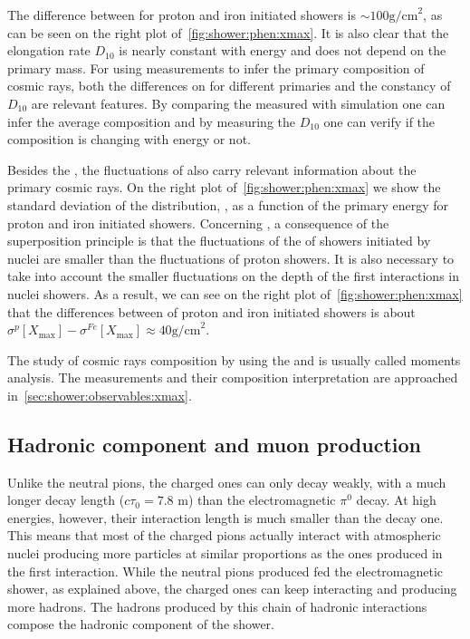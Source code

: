 The difference between \xmaxmean for
proton and iron initiated showers is $\sim 100 \text{g/cm}^2$, as can
be seen on the right plot of~\cref{fig:shower:phen:xmax}. It is also clear that the elongation rate
$D_{10}$ is nearly constant with energy and does not depend on the primary mass.
For using \xmax measurements to infer the primary composition of
cosmic rays, both the differences on \xmax for different primaries and
the constancy of $D_{10}$ are relevant features. By comparing the measured \xmaxmean
with simulation one can infer the average composition and by measuring
the $D_{10}$ one can verify if the composition is changing with energy or not. 


Besides the \xmaxmean, the fluctuations of \xmax also carry relevant information
about the primary cosmic rays. On the right plot of~\cref{fig:shower:phen:xmax}
we show the standard deviation of the \xmax distribution, \xmaxsig,
as a function of the primary energy for proton and iron initiated showers.
Concerning \xmaxsig, a consequence of the superposition principle
is that the fluctuations of the \xmax of showers initiated by nuclei
are smaller than the fluctuations of proton showers. It is also necessary
to take into account the smaller fluctuations on the depth of the first
interactions in nuclei showers. As a result,
we can see on the right plot of~\cref{fig:shower:phen:xmax}   
that the differences between \xmaxsig of proton and iron initiated showers is
about $\sigma^p[X_\text{max}]-\sigma^{Fe}[X_\text{max}] \approx 40 \text{g/cm}^2$.

The study of cosmic rays composition by using the \xmaxmean and \xmaxsig
is usually called \xmax moments analysis. The \xmax measurements
and their composition interpretation are approached in~\cref{sec:shower:observables:xmax}. 



\subsection{Hadronic component and muon production}
\label{sec:showers:phen:had}

Unlike the neutral pions, the charged ones can only decay weakly,
with a much longer decay length ($c\tau_0=7.8$ m)
than the electromagnetic $\pi^0$ decay.  
At high energies, however, their interaction length
is much smaller than the decay one. This means that most
of the charged pions actually interact with atmospheric nuclei
producing more particles at similar proportions as the ones produced
in the first interaction. While the neutral pions produced
fed the electromagnetic shower, as explained above, the charged ones
can keep interacting and producing more hadrons. The hadrons
produced by this chain of hadronic interactions compose the
hadronic component of the shower.

